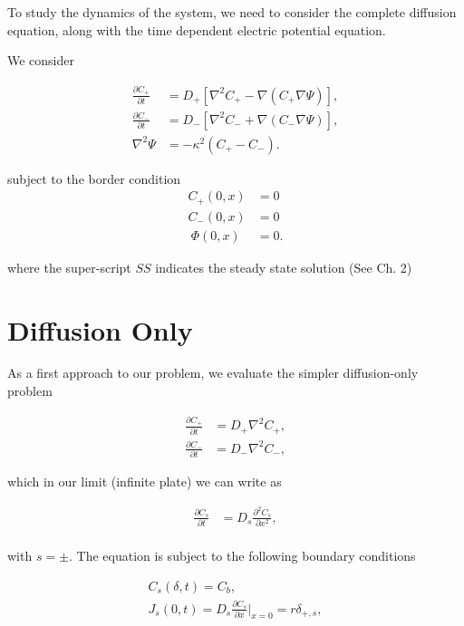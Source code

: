 
To study the dynamics of the system, we need to consider the complete diffusion equation, along with the time dependent electric potential equation.

We consider

\begin{align}
\frac{\partial C_+}{\partial t} &= D_+ \left[\nabla^2 C_+ -  \nabla (C_+ \nabla \Psi) \right] , \\
\frac{\partial C_-}{\partial t} &= D_- \left[\nabla^2 C_- + \nabla (C_- \nabla \Psi) \right], \\
\nabla^2 \Psi &= -\kappa^2 \left(C_+ - C_- \right).
\label{eq:dynamic-system}
\end{align}

subject to the border condition 
\begin{align}
C_+(0, x) & = 0\\
C_-(0, x) & =  0\\\
\Phi(0, x) &= 0.
\end{align}

where the super-script $SS$ indicates the steady state solution (See Ch. 2)%

\section{Diffusion Only}

As a first approach to our problem, we evaluate the simpler diffusion-only problem



\begin{align}
\frac{\partial C_+}{\partial t} &= D_+ \nabla^2 C_+,\\
\frac{\partial C_-}{\partial t} &= D_- \nabla^2 C_-,
\label{eq:diffusion}
\end{align}

which in our limit (infinite plate) we can write as


\begin{align}
\frac{\partial C_s}{\partial t} &= D_s \frac{\partial^2 C_s}{\partial x^2},\\
\label{eq:diffusion-1d}
\end{align}

with $s=\pm$. The equation is subject to the following boundary conditions


\begin{align}
C_s(\delta, t) = C_b,\\
J_s(0,t) = D_s\frac{\partial C_s}{\partial x}\big|_{x=0} = r\delta_{+,s},
\label{eq:diffusion-bc}
\end{align}


